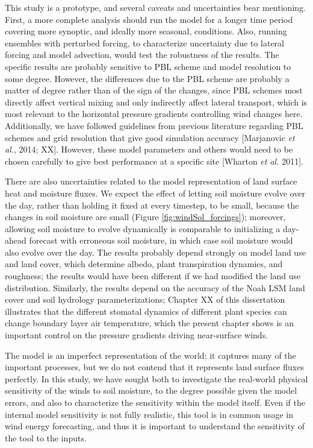 This study is a prototype, and several caveats and uncertainties bear mentioning.  First, a more complete analysis should run the model for a longer time period covering more synoptic, and ideally more seasonal, conditions.  Also, running ensembles with perturbed forcing, to characterize uncertainty due to lateral forcing and model advection, would test the robustness of the results.  The specific results are probably sensitive to PBL scheme and model resolution to some degree.  However, the differences due to the PBL scheme are probably a matter of degree rather than of the sign of the changes, since PBL schemes most directly affect vertical mixing and only indirectly affect lateral transport, which is most relevant to the horizontal pressure gradients controlling wind changes here.  Additionally, we have followed guidelines from previous literature regarding PBL schemes and grid resolution that give good simulation accuracy [Marjanovic \textit{et al.}, 2014; XX].  However, these model parameters and others would need to be chosen carefully to give best performance at a specific site [Wharton \textit{et al.} 2011].

There are also uncertainties related to the model representation of land surface heat and moisture fluxes.  We expect the effect of letting soil moisture evolve over the day, rather than holding it fixed at every timestep, to be small, because the changes in soil moisture are small (Figure \ref{fig:windSol_forcings}); moreover, allowing soil moisture to evolve dynamically is comparable to initializing a day-ahead forecast with erroneous soil moisture, in which case soil moisture would also evolve over the day.  The results probably depend strongly on model land use and land cover, which determine albedo, plant transpiration dynamics, and roughness; the results would have been different if we had modified the land use distribution.  Similarly, the results depend on the accuracy of the Noah LSM land cover and soil hydrology parameterizations; Chapter XX of this dissertation illustrates that the different stomatal dynamics of different plant species can change boundary layer air temperature, which the present chapter shows is an important control on the pressure gradients driving near-surface winds.

The model is an imperfect representation of the world; it captures many of the important processes, but we do not contend that it represents land surface fluxes perfectly.  In this study, we have sought both to investigate the real-world physical sensitivity of the winds to soil moisture, to the degree possible given the model errors, and also to characterize the sensitivity within the model itself.  Even if the internal model sensitivity is not fully realistic, this tool is in common usage in wind energy forecasting, and thus it is important to understand the sensitivity of the tool to the inputs.

